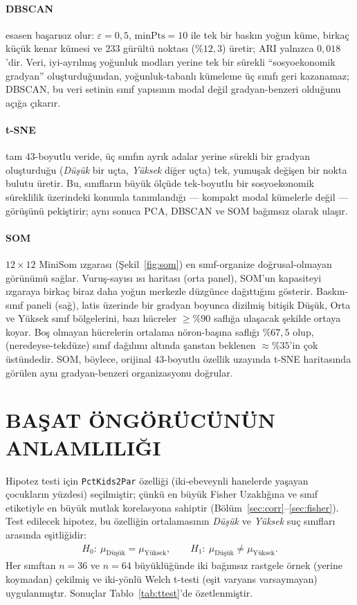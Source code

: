 \documentclass{ieeeaccess}
\begin{document}
\paragraph{DBSCAN} esasen başarısız olur: $\varepsilon=0{,}5$, $\mathrm{minPts}=10$ ile tek bir baskın yoğun küme, birkaç küçük kenar kümesi ve $233$ gürültü noktası ($\%12{,}3$) üretir; ARI yalnızca $0{,}018$'dir. Veri, iyi-ayrılmış yoğunluk modları yerine tek bir sürekli ``sosyoekonomik gradyan'' oluşturduğundan, yoğunluk-tabanlı kümeleme üç sınıfı geri kazanamaz; DBSCAN, bu veri setinin sınıf yapısının modal değil gradyan-benzeri olduğunu açığa çıkarır.

\paragraph{t-SNE} tam $43$-boyutlu veride, üç sınıfın ayrık adalar yerine sürekli bir gradyan oluşturduğu (\emph{Düşük} bir uçta, \emph{Yüksek} diğer uçta) tek, yumuşak değişen bir nokta bulutu üretir. Bu, sınıfların büyük ölçüde tek-boyutlu bir sosyoekonomik süreklilik üzerindeki konumla tanımlandığı --- kompakt modal kümelerle değil --- görüşünü pekiştirir; aynı sonuca PCA, DBSCAN ve SOM bağımsız olarak ulaşır.

\paragraph{SOM} $12\times 12$ MiniSom ızgarası (Şekil~\ref{fig:som}) en sınıf-organize doğrusal-olmayan görünümü sağlar. Vuruş-sayısı ısı haritası (orta panel), SOM'un kapasiteyi ızgaraya birkaç biraz daha yoğun merkezle düzgünce dağıttığını gösterir. Baskın-sınıf paneli (sağ), latis üzerinde bir gradyan boyunca dizilmiş bitişik Düşük, Orta ve Yüksek sınıf bölgelerini, bazı hücreler $\geq \%90$ saflığa ulaşacak şekilde ortaya koyar. Boş olmayan hücrelerin ortalama nöron-başına saflığı $\%67{,}5$ olup, (neredeyse-tekdüze) sınıf dağılımı altında şanstan beklenen $\approx \%35$'in çok üstündedir. SOM, böylece, orijinal $43$-boyutlu özellik uzayında t-SNE haritasında görülen aynı gradyan-benzeri organizasyonu doğrular.

\section{BAŞAT ÖNGÖRÜCÜNÜN ANLAMLILIĞI}
\label{sec:hypothesis}
Hipotez testi için \texttt{PctKids2Par} özelliği (iki-ebeveynli hanelerde yaşayan çocukların yüzdesi) seçilmiştir; çünkü en büyük Fisher Uzaklığına ve sınıf etiketiyle en büyük mutlak korelasyona sahiptir (Bölüm~\ref{sec:corr}--\ref{sec:fisher}). Test edilecek hipotez, bu özelliğin ortalamasının \emph{Düşük} ve \emph{Yüksek} suç sınıfları arasında eşitliğidir:
\begin{align*}
H_0:\ \mu_{\text{Düşük}} = \mu_{\text{Yüksek}}, \qquad
H_1:\ \mu_{\text{Düşük}} \neq \mu_{\text{Yüksek}}.
\end{align*}
Her sınıftan $n=36$ ve $n=64$ büyüklüğünde iki bağımsız rastgele örnek (yerine koymadan) çekilmiş ve iki-yönlü Welch t-testi \cite{welch} (eşit varyans varsaymayan) uygulanmıştır. Sonuçlar Tablo~\ref{tab:ttest}'de özetlenmiştir.
\end{document}
